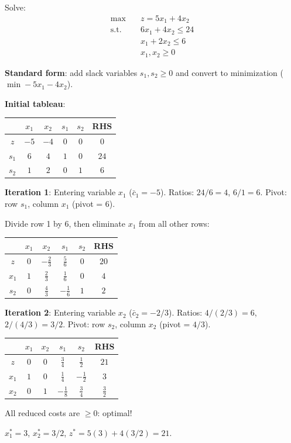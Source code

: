 \begin{example}
Solve:
\[
\begin{aligned}
  \max \quad & z = 5x_1 + 4x_2 \\
  \text{s.t.} \quad
    & 6x_1 + 4x_2 \le 24 \\
    & x_1 + 2x_2 \le 6 \\
    & x_1, x_2 \ge 0
\end{aligned}
\]

\textbf{Standard form}: add slack variables $s_1, s_2 \ge 0$ and convert to
minimization ($\min -5x_1 - 4x_2$).

\textbf{Initial tableau}:
\begin{center}
\begin{tabular}{c|cccc|c}
  & $x_1$ & $x_2$ & $s_1$ & $s_2$ & RHS \\
  \toprule
  $z$ & $-5$ & $-4$ & $0$ & $0$ & $0$ \\
  \midrule
  $s_1$ & $6$ & $4$ & $1$ & $0$ & $24$ \\
  $s_2$ & $1$ & $2$ & $0$ & $1$ & $6$ \\
\end{tabular}
\end{center}

\textbf{Iteration 1}: Entering variable $x_1$ ($\bar{c}_1 = -5$).
Ratios: $24/6 = 4$, $6/1 = 6$.  Pivot: row $s_1$, column $x_1$ (pivot = 6).

Divide row 1 by 6, then eliminate $x_1$ from all other rows:
\begin{center}
\begin{tabular}{c|cccc|c}
  & $x_1$ & $x_2$ & $s_1$ & $s_2$ & RHS \\
  \toprule
  $z$ & $0$ & $-\frac{2}{3}$ & $\frac{5}{6}$ & $0$ & $20$ \\
  \midrule
  $x_1$ & $1$ & $\frac{2}{3}$ & $\frac{1}{6}$ & $0$ & $4$ \\
  $s_2$ & $0$ & $\frac{4}{3}$ & $-\frac{1}{6}$ & $1$ & $2$ \\
\end{tabular}
\end{center}

\textbf{Iteration 2}: Entering variable $x_2$ ($\bar{c}_2 = -2/3$).
Ratios: $4/(2/3) = 6$, $2/(4/3) = 3/2$.  Pivot: row $s_2$, column $x_2$
(pivot = $4/3$).

\begin{center}
\begin{tabular}{c|cccc|c}
  & $x_1$ & $x_2$ & $s_1$ & $s_2$ & RHS \\
  \toprule
  $z$ & $0$ & $0$ & $\frac{3}{4}$ & $\frac{1}{2}$ & $21$ \\
  \midrule
  $x_1$ & $1$ & $0$ & $\frac{1}{4}$ & $-\frac{1}{2}$ & $3$ \\
  $x_2$ & $0$ & $1$ & $-\frac{1}{8}$ & $\frac{3}{4}$ & $\frac{3}{2}$ \\
\end{tabular}
\end{center}

All reduced costs are $\ge 0$: optimal!

$x_1^* = 3$, $x_2^* = 3/2$, $z^* = 5(3) + 4(3/2) = 21$.
\end{example}

